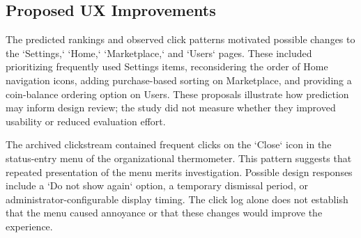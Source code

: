 \documentclass[sn-mathphys-num, Numbered]{sn-jnl}%
\theoremstyle{thmstyleone}%
\theoremstyle{thmstyletwo}%
\theoremstyle{thmstylethree}%
\providecommand{\DIFadd}[1]{{\protect\color{green!40!black}#1}} %
\providecommand{\DIFdel}[1]{}                      %
\providecommand{\DIFaddbegin}{} %
\providecommand{\DIFaddend}{} %
\providecommand{\DIFdelbegin}{} %
\providecommand{\DIFdelend}{} %
\newcommand{\DIFscaledelfig}{0.5}
\newlength{\DIFdelgraphicswidth} %
\newlength{\DIFdelgraphicsheight} %
\newcommand{\DIFaddincludegraphics}[2][]{{\color{blue}\fbox{\DIFOincludegraphics[#1]{#2}}}} %
\newcommand{\DIFdelincludegraphics}[2][]{%
\sbox{\DIFdelgraphicsbox}{\DIFOincludegraphics[#1]{#2}}%
\settoboxwidth{\DIFdelgraphicswidth}{\DIFdelgraphicsbox} %
\settoboxtotalheight{\DIFdelgraphicsheight}{\DIFdelgraphicsbox} %
\scalebox{\DIFscaledelfig}{%
\parbox[b]{\DIFdelgraphicswidth}{\usebox{\DIFdelgraphicsbox}\\[-\baselineskip] \rule{\DIFdelgraphicswidth}{0em}}\llap{\resizebox{\DIFdelgraphicswidth}{\DIFdelgraphicsheight}{%
\setlength{\unitlength}{\DIFdelgraphicswidth}%
\begin{picture}(1,1)%
\thicklines\linethickness{2pt} %
{\color[rgb]{1,0,0}\put(0,0){\framebox(1,1){}}}%
{\color[rgb]{1,0,0}\put(0,0){\line( 1,1){1}}}%
{\color[rgb]{1,0,0}\put(0,1){\line(1,-1){1}}}%
\end{picture}%
}\hspace*{3pt}}} %
} %
\DeclareRobustCommand{\DIFaddbegin}{\DIFOaddbegin \let\includegraphics\DIFaddincludegraphics} %
\DeclareRobustCommand{\DIFaddend}{\DIFOaddend \let\includegraphics\DIFOincludegraphics} %
\DeclareRobustCommand{\DIFdelbegin}{\DIFOdelbegin \let\includegraphics\DIFdelincludegraphics} %
\DeclareRobustCommand{\DIFdelend}{\DIFOaddend \let\includegraphics\DIFOincludegraphics} %
\begin{document}
\subsection{\DIFdelbegin \DIFdel{User Experience Improvement Evaluation}\DIFdelend \DIFaddbegin \DIFadd{Proposed UX Improvements}\DIFaddend }
\DIFdelbegin \DIFdel{To evaluate the improvement of the user experience, the results obtained from predicting the next user click and user experience tests were used to enhance various sections of the app, including the }\DIFdelend \DIFaddbegin \DIFadd{The predicted rankings and observed click patterns motivated possible changes to the }\DIFaddend `Settings,` `Home,` `Marketplace,` and `Users` pages. \DIFdelbegin \DIFdel{On the `Settings ` page, the list of features available was sorted by priority and usage frequency, so that users would see and interact with the most frequently used elements at the top of the list. This was also applied to the bottom menu of the `Home ` page, which contains several iconssuch as `Home, ` `Marketplace, ` `Users,` and `Settings,` to ensure that users were faced with the elements they had interacted with the most. On the `Marketplace` page, items or services with the highest sales were sorted, and the option to sort by most purchased items was added to make them more accessible to users.
On the `Users` page, the option to show users with the highest coin balance was implemented.

}\DIFdelend \DIFaddbegin \DIFadd{These included prioritizing frequently used Settings items, reconsidering the order of Home navigation icons, adding purchase-based sorting on Marketplace, and providing a coin-balance ordering option on Users. These proposals illustrate how prediction may inform design review; the study did not measure whether they improved usability or reduced evaluation effort.
}\DIFaddend 

The \DIFdelbegin \DIFdel{first-click test showed that users frequently clicked }\DIFdelend \DIFaddbegin \DIFadd{archived clickstream contained frequent clicks on }\DIFaddend the `Close` icon in the \DIFdelbegin \DIFdel{status entry menu in }\DIFdelend \DIFaddbegin \DIFadd{status-entry menu of }\DIFaddend the organizational thermometer\DIFdelbegin \DIFdel{, indicating that they did not need to repeatedly interact with this menu in a way that could become annoying. For example, users can click the }\DIFdelend \DIFaddbegin \DIFadd{. This pattern suggests that repeated presentation of the menu merits investigation. Possible design responses include a }\DIFaddend `Do not show again` option, \DIFdelbegin \DIFdel{and they will not encounter this menu upon each app launch. Another solution implemented was that by selecting this option, the section would not appear for a day, or the system administrator could customize the display time of this modal. For example, the modal would not be shown again until after a certain period since the user's last entry, so it wouldn't be bothersome}\DIFdelend \DIFaddbegin \DIFadd{a temporary dismissal period, or administrator-configurable display timing. The click log alone does not establish that the menu caused annoyance or that these changes would improve the experience}\DIFaddend .
\end{document}
